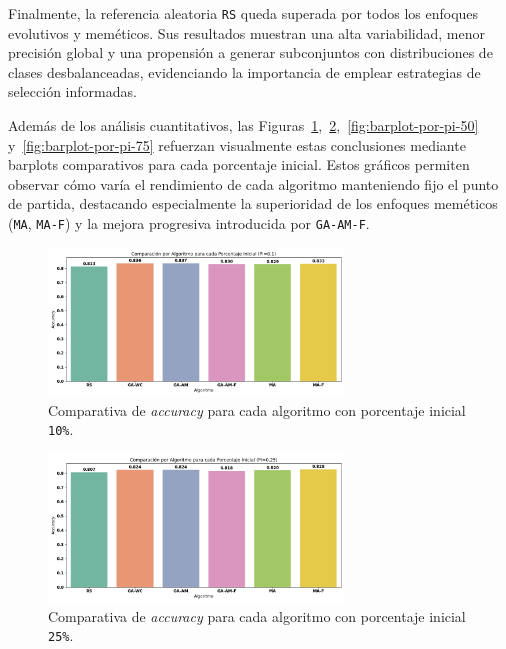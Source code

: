 Finalmente, la referencia aleatoria \texttt{RS} queda superada por todos los enfoques evolutivos y meméticos.
Sus resultados muestran una alta variabilidad, menor precisión global y una propensión a generar subconjuntos con distribuciones de clases desbalanceadas,
evidenciando la importancia de emplear estrategias de selección informadas.

Además de los análisis cuantitativos, las Figuras~\ref{fig:barplot-por-pi-10},~\ref{fig:barplot-por-pi-25},~\ref{fig:barplot-por-pi-50} y~\ref{fig:barplot-por-pi-75}
refuerzan visualmente estas conclusiones mediante barplots comparativos para cada porcentaje inicial.
Estos gráficos permiten observar cómo varía el rendimiento de cada algoritmo manteniendo fijo el punto de partida,
destacando especialmente la superioridad de los enfoques meméticos (\texttt{MA}, \texttt{MA-F}) y la mejora progresiva introducida por \texttt{GA-AM-F}.

\begin{figure}[htp]
    \centering
    \includegraphics[width=0.7\textwidth]{imagenes/evaluaciones/final/barplot-por-pi/pi-10.png}
    \caption{Comparativa de \textit{accuracy} para cada algoritmo con porcentaje inicial \texttt{10\%}.}
    \label{fig:barplot-por-pi-10}
\end{figure}

\begin{figure}[htp]
    \centering
    \includegraphics[width=0.7\textwidth]{imagenes/evaluaciones/final/barplot-por-pi/pi-25.png}
    \caption{Comparativa de \textit{accuracy} para cada algoritmo con porcentaje inicial \texttt{25\%}.}
    \label{fig:barplot-por-pi-25}
\end{figure}

